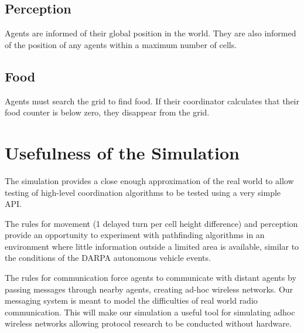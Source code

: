 \subsection{Perception}

Agents are informed of their global position in the world. They are also informed of the position of any agents within a maximum number of cells.

\subsection{Food}

Agents must search the grid to find food. If their coordinator calculates that their food counter is below zero, they disappear from the grid.

\section{Usefulness of the Simulation}

The simulation provides a close enough approximation of the real world to allow testing of high-level coordination algorithms to be tested using a very simple API.

The rules for movement (1 delayed turn per cell height difference) and perception provide an opportunity to experiment with pathfinding algorithms in an environment where little information outside a limited area is available, similar to the conditions of the DARPA autonomous vehicle events.

The rules for communication force agents to communicate with distant agents by passing messages through nearby agents, creating ad-hoc wireless networks. Our messaging system is meant to model the difficulties of real world radio communication. This will make our simulation a useful tool for simulating adhoc wireless networks allowing protocol research to be conducted without hardware.

